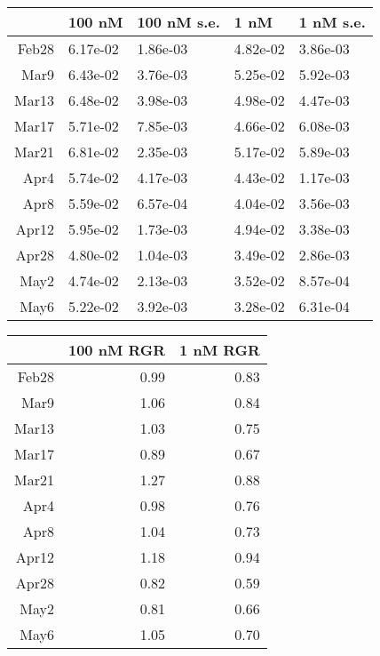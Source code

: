 \documentclass{article}
\begin{document}
\begin{table}[ht]
\centering
\begin{tabular}{rllll}
  \hline
 & 100 nM & 100 nM s.e. & 1 nM & 1 nM s.e. \\ 
  \hline
Feb28 & 6.17e-02 & 1.86e-03 & 4.82e-02 & 3.86e-03 \\ 
  Mar9 & 6.43e-02 & 3.76e-03 & 5.25e-02 & 5.92e-03 \\ 
  Mar13 & 6.48e-02 & 3.98e-03 & 4.98e-02 & 4.47e-03 \\ 
  Mar17 & 5.71e-02 & 7.85e-03 & 4.66e-02 & 6.08e-03 \\ 
  Mar21 & 6.81e-02 & 2.35e-03 & 5.17e-02 & 5.89e-03 \\ 
  Apr4 & 5.74e-02 & 4.17e-03 & 4.43e-02 & 1.17e-03 \\ 
  Apr8 & 5.59e-02 & 6.57e-04 & 4.04e-02 & 3.56e-03 \\ 
  Apr12 & 5.95e-02 & 1.73e-03 & 4.94e-02 & 3.38e-03 \\ 
  Apr28 & 4.80e-02 & 1.04e-03 & 3.49e-02 & 2.86e-03 \\ 
  May2 & 4.74e-02 & 2.13e-03 & 3.52e-02 & 8.57e-04 \\ 
  May6 & 5.22e-02 & 3.92e-03 & 3.28e-02 & 6.31e-04 \\ 
   \hline
\end{tabular}
\end{table}


\begin{table}[ht]
\centering
\begin{tabular}{rrr}
  \hline
 & 100 nM RGR & 1 nM RGR \\ 
  \hline
Feb28 & 0.99 & 0.83 \\ 
  Mar9 & 1.06 & 0.84 \\ 
  Mar13 & 1.03 & 0.75 \\ 
  Mar17 & 0.89 & 0.67 \\ 
  Mar21 & 1.27 & 0.88 \\ 
  Apr4 & 0.98 & 0.76 \\ 
  Apr8 & 1.04 & 0.73 \\ 
  Apr12 & 1.18 & 0.94 \\ 
  Apr28 & 0.82 & 0.59 \\ 
  May2 & 0.81 & 0.66 \\ 
  May6 & 1.05 & 0.70 \\ 
   \hline
\end{tabular}
\end{table}
\end{document}

